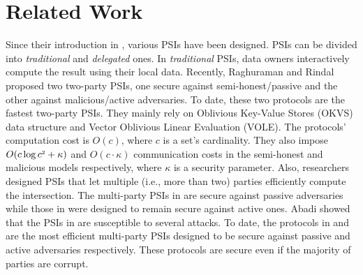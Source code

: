 

\vspace{-2.5mm}
\section{Related Work}\label{sec::related-work}


Since their introduction in \cite{DBLP:conf/eurocrypt/FreedmanNP04}, various PSIs have been designed. PSIs can be divided into \textit{traditional} and \textit{delegated} ones.  
%
In \textit{traditional} PSIs, data owners interactively compute the result using their local data. 
%
Recently, Raghuraman and Rindal \cite{RaghuramanR22} proposed two two-party PSIs, one secure against semi-honest/passive and the other against malicious/active adversaries. To date, these two protocols are the fastest two-party PSIs. They mainly rely on  Oblivious Key-Value Stores (OKVS) data structure and Vector Oblivious Linear Evaluation (VOLE). The protocols' computation cost is $O(c)$, where $c$ is  a set's cardinality.  They also impose $O(c\log c^{\scriptscriptstyle 2}+\kappa)$ and $O(c\cdot \kappa)$ communication costs in the semi-honest and malicious models respectively, 
where 
$\kappa$ is a security parameter.  
%
Also, researchers designed PSIs that  let multiple (i.e., more than two) parties efficiently compute the intersection. The multi-party PSIs in  \cite{DBLP:conf/scn/InbarOP18,DBLP:conf/ccs/KolesnikovMPRT17} are secure against  passive adversaries while those in \cite{Ben-EfraimNOP21,GhoshN19,ZhangLLJL19,DBLP:conf/ccs/KolesnikovMPRT17,NevoTY21} were designed to remain secure against  active ones. Abadi \et  \cite{AbadiMZ21} showed that the PSIs in  \cite{GhoshN19} are susceptible to several attacks.  To date, the  protocols  in   \cite{DBLP:conf/ccs/KolesnikovMPRT17} and  \cite{NevoTY21} are the most  efficient multi-party PSIs  designed to be  secure against passive and active  adversaries respectively. These protocols are secure even if  the majority of parties are corrupt.  
%
%

